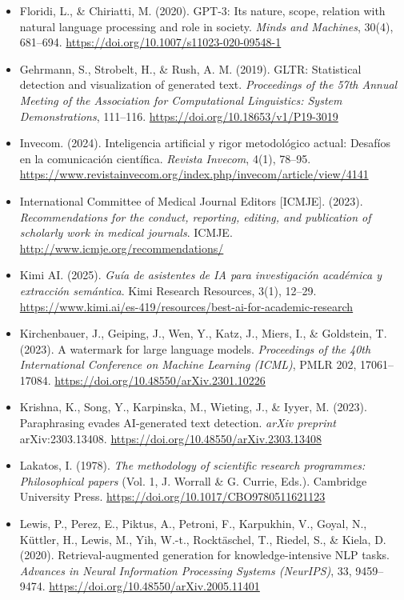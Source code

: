 \begin{itemize}[leftmargin=1.5em, label={}, itemsep=0.22ex, parsep=0pt]
    \item Floridi, L., \& Chiriatti, M. (2020). GPT-3: Its nature, scope, relation with natural language processing and role in society. \textit{Minds and Machines}, 30(4), 681--694. \url{https://doi.org/10.1007/s11023-020-09548-1}
    \item Gehrmann, S., Strobelt, H., \& Rush, A. M. (2019). GLTR: Statistical detection and visualization of generated text. \textit{Proceedings of the 57th Annual Meeting of the Association for Computational Linguistics: System Demonstrations}, 111--116. \url{https://doi.org/10.18653/v1/P19-3019}
    \item Invecom. (2024). Inteligencia artificial y rigor metodológico actual: Desafíos en la comunicación científica. \textit{Revista Invecom}, 4(1), 78--95. \url{https://www.revistainvecom.org/index.php/invecom/article/view/4141}
    \item International Committee of Medical Journal Editors [ICMJE]. (2023). \textit{Recommendations for the conduct, reporting, editing, and publication of scholarly work in medical journals}. ICMJE. \url{http://www.icmje.org/recommendations/}
    \item Kimi AI. (2025). \textit{Guía de asistentes de IA para investigación académica y extracción semántica}. Kimi Research Resources, 3(1), 12--29. \url{https://www.kimi.ai/es-419/resources/best-ai-for-academic-research}
    \item Kirchenbauer, J., Geiping, J., Wen, Y., Katz, J., Miers, I., \& Goldstein, T. (2023). A watermark for large language models. \textit{Proceedings of the 40th International Conference on Machine Learning (ICML)}, PMLR 202, 17061--17084. \url{https://doi.org/10.48550/arXiv.2301.10226}
    \item Krishna, K., Song, Y., Karpinska, M., Wieting, J., \& Iyyer, M. (2023). Paraphrasing evades AI-generated text detection. \textit{arXiv preprint} arXiv:2303.13408. \url{https://doi.org/10.48550/arXiv.2303.13408}
    \item Lakatos, I. (1978). \textit{The methodology of scientific research programmes: Philosophical papers} (Vol. 1, J. Worrall \& G. Currie, Eds.). Cambridge University Press. \url{https://doi.org/10.1017/CBO9780511621123}
    \item Lewis, P., Perez, E., Piktus, A., Petroni, F., Karpukhin, V., Goyal, N., Küttler, H., Lewis, M., Yih, W.-t., Rocktäschel, T., Riedel, S., \& Kiela, D. (2020). Retrieval-augmented generation for knowledge-intensive NLP tasks. \textit{Advances in Neural Information Processing Systems (NeurIPS)}, 33, 9459--9474. \url{https://doi.org/10.48550/arXiv.2005.11401}

\end{itemize}
